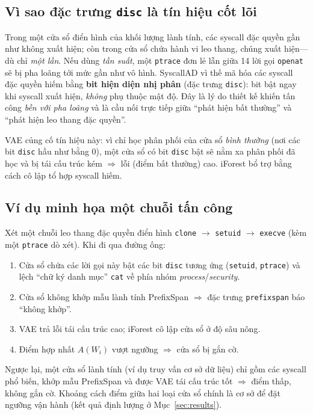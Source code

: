\subsection{Vì sao đặc trưng \texttt{disc} là tín hiệu cốt lõi}
Trong một cửa sổ điển hình của khối lượng lành tính, các syscall đặc quyền gần như
không xuất hiện; còn trong cửa sổ chứa hành vi leo thang, chúng xuất hiện---dù chỉ
\emph{một lần}. Nếu dùng \emph{tần suất}, một \texttt{ptrace} đơn lẻ lẫn giữa 14 lời
gọi \texttt{openat} sẽ bị pha loãng tới mức gần như vô hình. SyscallAD vì thế mã hóa
các syscall đặc quyền hiếm bằng \textbf{bit hiện diện nhị phân} (đặc trưng
\texttt{disc}): bit bật ngay khi syscall xuất hiện, \emph{không} phụ thuộc mật độ.
Đây là lý do thiết kế khiến tấn công \emph{bền với pha loãng} và là cầu nối trực
tiếp giữa ``phát hiện bất thường'' và ``phát hiện leo thang đặc quyền''.

VAE củng cố tín hiệu này: vì chỉ học phân phối của cửa sổ \emph{bình thường} (nơi
các bit \texttt{disc} hầu như bằng 0), một cửa sổ có bit \texttt{disc} bật sẽ nằm xa
phân phối đã học và bị tái cấu trúc kém $\Rightarrow$ lỗi (điểm bất thường) cao.
iForest bổ trợ bằng cách cô lập tổ hợp syscall hiếm.

\subsection{Ví dụ minh họa một chuỗi tấn công}
Xét một chuỗi leo thang đặc quyền điển hình \texttt{clone} $\to$ \texttt{setuid}
$\to$ \texttt{execve} (kèm một \texttt{ptrace} dò xét). Khi đi qua đường ống:
\begin{enumerate}[leftmargin=1.8em]
  \item Cửa sổ chứa các lời gọi này bật các bit \texttt{disc} tương ứng
        (\texttt{setuid}, \texttt{ptrace}) và lệch ``chữ ký danh mục'' \texttt{cat}
        về phía nhóm \emph{process}/\emph{security}.
  \item Cửa sổ không khớp mẫu lành tính PrefixSpan $\Rightarrow$ đặc trưng
        \texttt{prefixspan} báo ``không khớp''.
  \item VAE trả lỗi tái cấu trúc cao; iForest cô lập cửa sổ ở độ sâu nông.
  \item Điểm hợp nhất $A(W_i)$ vượt ngưỡng $\Rightarrow$ cửa sổ bị gắn cờ.
\end{enumerate}
Ngược lại, một cửa sổ lành tính (ví dụ truy vấn cơ sở dữ liệu) chỉ gồm các syscall
phổ biến, khớp mẫu PrefixSpan và được VAE tái cấu trúc tốt $\Rightarrow$ điểm thấp,
không gắn cờ. Khoảng cách điểm giữa hai loại cửa sổ chính là cơ sở để đặt ngưỡng vận
hành (kết quả định lượng ở Mục~\ref{sec:results}).
